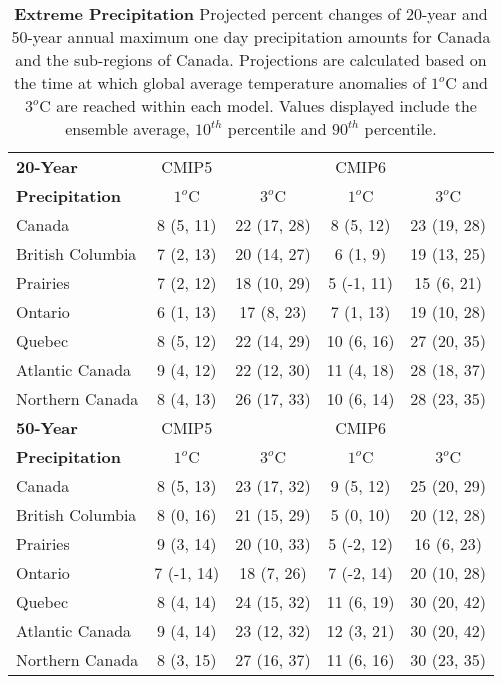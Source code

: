 \documentclass[]{scrartcl}
\begin{document}
\begin{appendices}
\begin{table}[t]
	\caption{\textbf{Extreme Precipitation} Projected percent changes of 20-year and 50-year annual maximum one day precipitation amounts for Canada and the sub-regions of Canada. Projections are calculated based on the time at which global average temperature anomalies of $1^o$C and $3^o$C are reached within each model. Values displayed include the ensemble average, $10^{th}$ percentile and $90^{th}$ percentile.}\label{table:deg_ext_pr}
	\begin{center}
		\begin{tabularx}{\linewidth}{|L|cc|cc|} 
			\hline
			\textbf{20-Year} & CMIP5 &  & CMIP6 &   \\
			\textbf{Precipitation} & $1^o$C & $3^o$C & $1^o$C & $3^o$C \\
			\hline
			Canada & 8 (5, 11) & 22 (17, 28) & 8 (5, 12) & 23 (19, 28) \\ 
			British Columbia & 7 (2, 13) & 20 (14, 27) & 6 (1, 9) & 19 (13, 25) \\ 
			Prairies & 7 (2, 12) & 18 (10, 29) & 5 (-1, 11) & 15 (6, 21) \\ 
			Ontario & 6 (1, 13) & 17 (8, 23) & 7 (1, 13) & 19 (10, 28) \\ 
			Quebec & 8 (5, 12) & 22 (14, 29) & 10 (6, 16) & 27 (20, 35) \\ 
			Atlantic Canada & 9 (4, 12) & 22 (12, 30) & 11 (4, 18) & 28 (18, 37) \\ 
			Northern Canada & 8 (4, 13) & 26 (17, 33) & 10 (6, 14) & 28 (23, 35) \\
			\hline
			\textbf{50-Year} & CMIP5 &  & CMIP6 &   \\
			\textbf{Precipitation} & $1^o$C & $3^o$C & $1^o$C & $3^o$C \\	
			\hline
			Canada & 8 (5, 13) & 23 (17, 32) & 9 (5, 12) & 25 (20, 29) \\ 
			British Columbia & 8 (0, 16) & 21 (15, 29) & 5 (0, 10) & 20 (12, 28) \\ 
			Prairies & 9 (3, 14) & 20 (10, 33) & 5 (-2, 12) & 16 (6, 23) \\ 
			Ontario & 7 (-1, 14) & 18 (7, 26) & 7 (-2, 14) & 20 (10, 28) \\ 
			Quebec & 8 (4, 14) & 24 (15, 32) & 11 (6, 19) & 30 (20, 42) \\ 
			Atlantic Canada & 9 (4, 14) & 23 (12, 32) & 12 (3, 21) & 30 (20, 42) \\ 
			Northern Canada & 8 (3, 15) & 27 (16, 37) & 11 (6, 16) & 30 (23, 35) \\ 
			\hline	
		\end{tabularx}
	\end{center}
\end{table}



\end{appendices}

\clearpage

\end{document}
